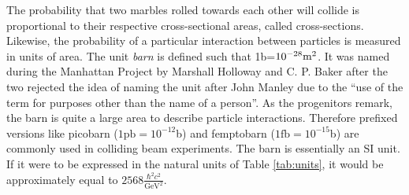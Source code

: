 The probability that two marbles rolled towards each other will collide is proportional to their respective cross-sectional areas, called cross-sections.
Likewise, the probability of a particular interaction between particles is measured in units of area.
The unit \emph{barn} is defined such that 1b=$10^{-28}\text m^2$.
It was named during the Manhattan Project by Marshall Holloway and C. P. Baker after the two rejected the idea of naming the unit after John Manley due to the ``use of the term for purposes other than the name of a person''.\cite{holloway}
As the progenitors remark, the barn is quite a large area to describe particle interactions. 
Therefore prefixed versions like picobarn ($1\text{pb}=10^{-12}$b) and femptobarn ($1\text{fb}=10^{-15}$b) are commonly used in colliding beam experiments.
The barn is essentially an SI unit. If it were to be expressed in the natural units of Table \ref{tab:units}, it would be approximately equal to $2568\frac{\hbar^2 c^2}{\text{GeV}^2}$.
